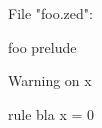 File "foo.zed":
\begin{zsection}
 \SECTION foo \parents prelude
\end{zsection}

Warning on x
\begin{theorem}{rule bla}
 x = 0
\end{theorem}

